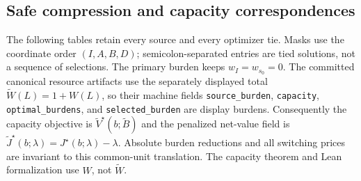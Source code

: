 \begin{landscape}
\subsection{Safe compression and capacity correspondences}

The following tables retain every source and every optimizer tie.  Masks use
the coordinate order \((I,A,B,D)\); semicolon-separated entries are tied
solutions, not a sequence of selections.
The primary burden keeps \(w_I=w_{s_0}=0\).  The committed canonical resource
artifacts use the separately displayed total
\(\widetilde W(L)=1+W(L)\), so their machine fields
\texttt{source\_burden}, \texttt{capacity}, \texttt{optimal\_burdens}, and
\texttt{selected\_burden} are display burdens.  Consequently the capacity
objective is \(\widetilde V^\star(b;\widetilde B)\) and the penalized net-value
field is \(\widetilde J^\star(b;\lambda)=J^\star(b;\lambda)-\lambda\).
Absolute burden reductions and all switching prices are invariant to this
common-unit translation.  The capacity theorem and Lean formalization use
\(W\), not \(\widetilde W\).

\tiny
{}


\end{landscape}
